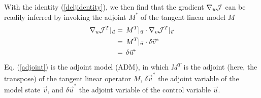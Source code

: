 %
With the identity (\ref{deljidentity}), we then find that
the gradient $ \nabla _{u}{\cal J} $ can be readily inferred by 
invoking the adjoint $ M^{\ast } $ of the tangent linear model $ M $
%
\begin{equation}
\begin{split}
\nabla _{u}{\cal J}^T |_{\vec{u}} & 
= \, M^T |_{\vec{u}} \cdot \nabla _{v}{\cal J}^T |_{\vec{v}}  \\
~ & = \, M^T |_{\vec{u}} \cdot \delta \vec{v}^{\ast} \\
~ & = \, \delta \vec{u}^{\ast}
\end{split}
\label{adjoint}
\end{equation}
%
Eq. (\ref{adjoint}) is the {\sf adjoint model (ADM)}, 
in which $M^T$ is the adjoint (here, the transpose) of the 
tangent linear operator $M$, $ \delta \vec{v}^{\ast} $ 
the adjoint variable of the model state $ \vec{v} $, and
$ \delta \vec{u}^{\ast} $ the adjoint variable of the control variable $ \vec{u} $.

